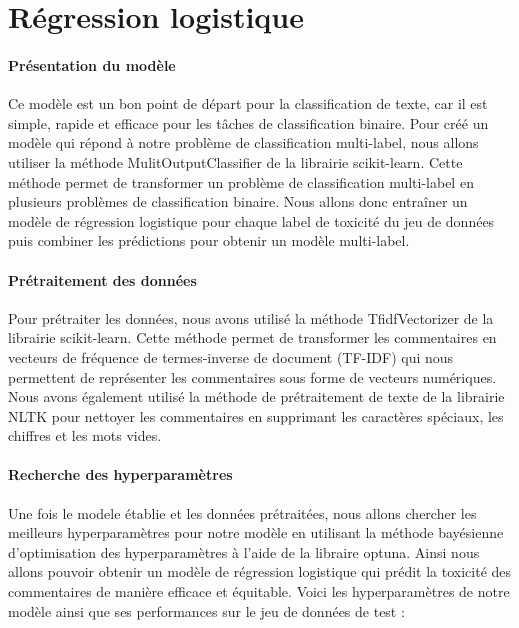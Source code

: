 \chapter{Régression logistique}

\subsubsection*{Présentation du modèle}

Ce modèle est un bon point de départ pour la classification de texte, car il est simple, rapide et efficace pour les tâches de classification binaire.
Pour créé un modèle qui répond à notre problème de classification multi-label, nous allons utiliser la méthode MulitOutputClassifier de la librairie scikit-learn.
Cette méthode permet de transformer un problème de classification multi-label en plusieurs problèmes de classification binaire.
Nous allons donc entraîner un modèle de régression logistique pour chaque label de toxicité du jeu de données puis combiner les prédictions pour obtenir un modèle multi-label.

\subsubsection*{Prétraitement des données}

Pour prétraiter les données, nous avons utilisé la méthode TfidfVectorizer de la librairie scikit-learn.
Cette méthode permet de transformer les commentaires en vecteurs de fréquence de termes-inverse de document (TF-IDF) qui nous permettent de représenter les commentaires sous forme de vecteurs numériques.
Nous avons également utilisé la méthode de prétraitement de texte de la librairie NLTK pour nettoyer les commentaires en supprimant les caractères spéciaux, les chiffres et les mots vides.

\subsubsection*{Recherche des hyperparamètres}
Une fois le modele établie et les données prétraitées, nous allons chercher les meilleurs hyperparamètres pour notre modèle en utilisant la méthode bayésienne d'optimisation des hyperparamètres à l'aide de la libraire optuna.
Ainsi nous allons pouvoir obtenir un modèle de régression logistique qui prédit la toxicité des commentaires de manière efficace et équitable.
Voici les hyperparamètres de notre modèle ainsi que ses performances sur le jeu de données de test :

